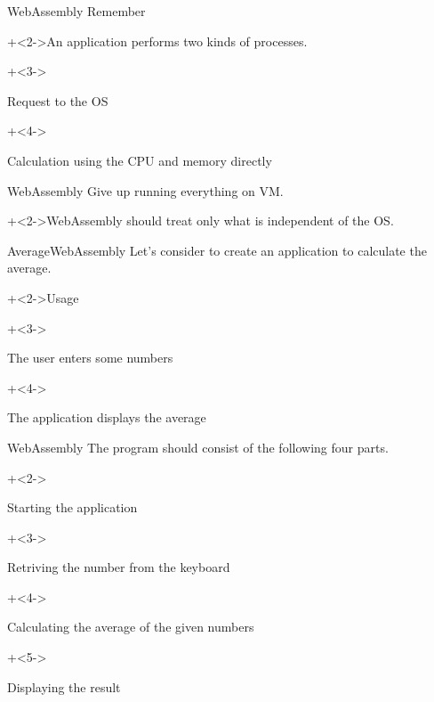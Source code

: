\begin{frame}{WebAssembly}{}
    Remember
    \vspace{2ex}

    \onslide+<2->{An application performs two kinds of processes.}
    \vspace{4ex}

    \begin{itemize}
        \onslide+<3->{\item Request to the OS}
        \onslide+<4->{\item Calculation using the CPU and memory directly}
    \end{itemize}
\end{frame}


\begin{frame}{WebAssembly}{}
    Give up running everything on VM.
    \vspace{4ex}

    \onslide+<2->{WebAssembly should treat only what is independent of the OS.}
\end{frame}


\begin{frame}{Average}{WebAssembly}
    Let's consider to create an application to calculate the average.
    \vspace{4ex}

    \onslide+<2->{Usage}
    \vspace{2ex}

    \begin{enumerate}
        \onslide+<3->{\item The user enters some numbers}
        \onslide+<4->{\item The application displays the average}
    \end{enumerate}
\end{frame}


\begin{frame}{WebAssembly}{}
    The program should consist of the following four parts.
    \vspace{2ex}

    \begin{enumerate}
        \onslide+<2->{\item Starting the application}
        \onslide+<3->{\item Retriving the number from the keyboard}
        \onslide+<4->{\item Calculating the average of the given numbers}
        \onslide+<5->{\item Displaying the result}
    \end{enumerate}
\end{frame}



